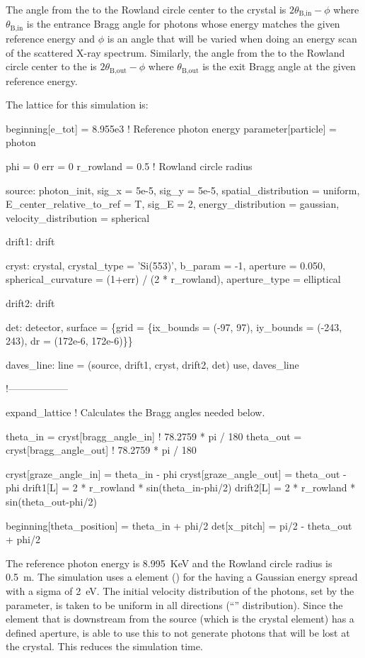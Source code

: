 The angle from the  to the Rowland circle center to the crystal is
$2\theta_\text{B,in}-\phi$ where $\theta_\text{B,in}$ is the entrance Bragg angle for photons whose
energy matches the given reference energy and $\phi$ is an angle that will be varied when doing an energy
scan of the scattered X-ray spectrum. Similarly, the angle from the  to the Rowland
circle center to the  is $2\theta_\text{B,out}-\phi$ where $\theta_\text{B,out}$ is the
exit Bragg angle at the given reference energy.

The lattice for this simulation is:
\begin{example}
  beginning[e_tot] = 8.955e3    ! Reference photon energy
  parameter[particle] = photon

  phi = 0
  err = 0
  r_rowland = 0.5               ! Rowland circle radius

  source: photon_init, sig_x = 5e-5, sig_y = 5e-5, spatial_distribution = uniform,
          E_center_relative_to_ref = T, sig_E = 2, energy_distribution = gaussian,
          velocity_distribution = spherical

  drift1: drift

  cryst: crystal, crystal_type = 'Si(553)', b_param = -1, aperture = 0.050,
  	spherical_curvature = (1+err) / (2 * r_rowland), aperture_type = elliptical

  drift2: drift

  det: detector, surface = \{grid = \{ix_bounds = (-97, 97), 
                                    iy_bounds = (-243, 243), dr = (172e-6, 172e-6)\}\}

  daves_line: line = (source, drift1, cryst, drift2, det)
  use, daves_line

  !------------------

  expand_lattice ! Calculates the Bragg angles needed below.

  theta_in  = cryst[bragg_angle_in]  ! 78.2759 * pi / 180
  theta_out = cryst[bragg_angle_out] ! 78.2759 * pi / 180

  cryst[graze_angle_in]  = theta_in - phi
  cryst[graze_angle_out] = theta_out - phi
  drift1[L] = 2 * r_rowland * sin(theta_in-phi/2)
  drift2[L] = 2 * r_rowland * sin(theta_out-phi/2)

  beginning[theta_position] = theta_in + phi/2
  det[x_pitch] = pi/2 - theta_out + phi/2
\end{example}

The reference photon energy is 8.995~KeV and the Rowland circle radius is 0.5~m. The simulation uses
a  element () for the  having a Gaussian energy
spread with a sigma of 2~eV.  The initial velocity distribution of the photons, set by the
 parameter, is taken to be uniform in all directions (``''
distribution). Since the element that is downstream from the source (which is the crystal element)
has a defined aperture, \bmad is able to use this to not generate photons that will be lost at the
crystal. This reduces the simulation time.

